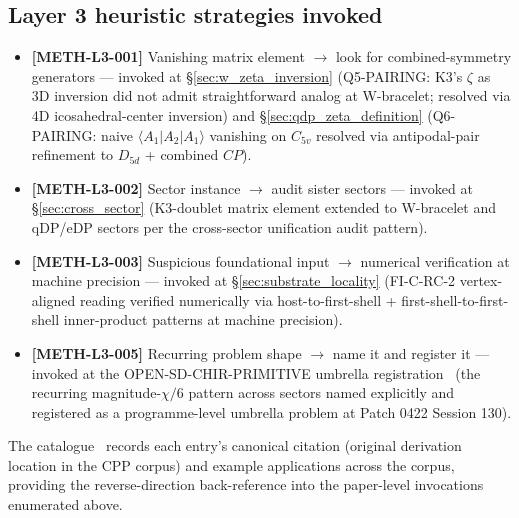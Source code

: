 \documentclass[11pt,letterpaper]{article}
\begin{document}
\subsection{Layer 3 heuristic strategies invoked}\label{sec:meth_l3_xref}

\begin{itemize}\setlength\itemsep{0.15em}
    \item \textbf{[METH-L3-001]} Vanishing matrix element $\to$ look for combined-symmetry generators --- invoked at \S\ref{sec:w_zeta_inversion} (Q5-PAIRING: K3's $\zeta$ as 3D inversion did not admit straightforward analog at W-bracelet; resolved via 4D icosahedral-center inversion) and \S\ref{sec:qdp_zeta_definition} (Q6-PAIRING: naive $\langle A_1|A_2|A_1\rangle$ vanishing on $C_{5v}$ resolved via antipodal-pair refinement to $D_{5d}$ + combined $CP$).
    \item \textbf{[METH-L3-002]} Sector instance $\to$ audit sister sectors --- invoked at \S\ref{sec:cross_sector} (K3-doublet matrix element extended to W-bracelet and qDP/eDP sectors per the cross-sector unification audit pattern).
    \item \textbf{[METH-L3-003]} Suspicious foundational input $\to$ numerical verification at machine precision --- invoked at \S\ref{sec:substrate_locality} (FI-C-RC-2 vertex-aligned reading verified numerically via host-to-first-shell + first-shell-to-first-shell inner-product patterns at machine precision).
    \item \textbf{[METH-L3-005]} Recurring problem shape $\to$ name it and register it --- invoked at the OPEN-SD-CHIR-PRIMITIVE umbrella registration~\cite{abshier_research_frontier} (the recurring magnitude-$\chi/6$ pattern across sectors named explicitly and registered as a programme-level umbrella problem at Patch 0422 Session 130).
\end{itemize}

The catalogue~\cite{abshier_methods_catalogue} records each entry's canonical citation (original derivation location in the CPP corpus) and example applications across the corpus, providing the reverse-direction back-reference into the paper-level invocations enumerated above.
\end{document}
